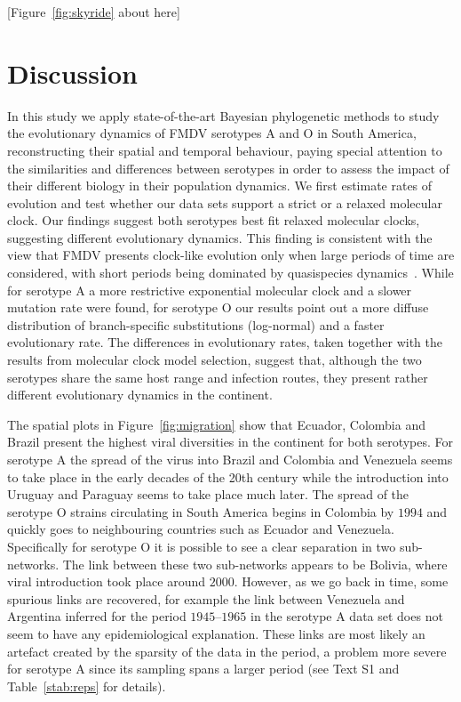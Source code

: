 \documentclass[10pt]{article}
\begin{document}
\begin{center}
 [Figure~\ref{fig:skyride} about here]
\end{center}

\section*{Discussion}


In this study we apply state-of-the-art Bayesian phylogenetic methods to study the evolutionary dynamics of FMDV serotypes A and O in South America, reconstructing their spatial and temporal behaviour, paying special attention to the similarities and differences between serotypes in order to assess the impact of their different biology in their population dynamics.
We first estimate rates of evolution and test whether our data sets support a strict or a relaxed molecular clock.
Our findings suggest both serotypes best fit relaxed molecular clocks, suggesting different evolutionary dynamics.
This finding is consistent with the view that FMDV presents clock-like evolution only when large periods of time are considered, with short periods being dominated by quasispecies dynamics~\cite{Muellner2011}.  
While for serotype A a more restrictive exponential molecular clock and a slower mutation rate were found, for serotype O our results point out a more diffuse distribution of branch-specific substitutions (log-normal) and a faster evolutionary rate.
The differences in evolutionary rates, taken together with the results from molecular clock model selection, suggest that, although the two serotypes share the same host range and infection routes, they present rather different evolutionary dynamics in the continent. 

The spatial plots in Figure~\ref{fig:migration} show that Ecuador, Colombia and Brazil present the highest viral diversities in the continent for both serotypes.
For serotype A the spread of the virus into  Brazil and Colombia and Venezuela seems to take place in the early decades of the 20th century while the introduction into Uruguay and Paraguay seems to take place much later.
The spread of the serotype O strains  circulating  in South America begins in Colombia by $1994$ and quickly goes to neighbouring countries such as Ecuador and Venezuela.
Specifically for serotype O it is possible to see a clear separation in two sub-networks.
The link between these two sub-networks appears to be Bolivia, where viral introduction took place around $2000$. 
However, as we go back in time, some spurious links are recovered, for example the link between Venezuela and Argentina inferred for the period $1945$--$1965$ in the serotype A data set does not seem to have any epidemiological explanation.
These links are most likely an artefact created by the sparsity of the data in the period, a problem more severe for serotype A since its sampling spans a larger period (see Text S1 and Table~\ref{stab:reps} for details).
\end{document}
